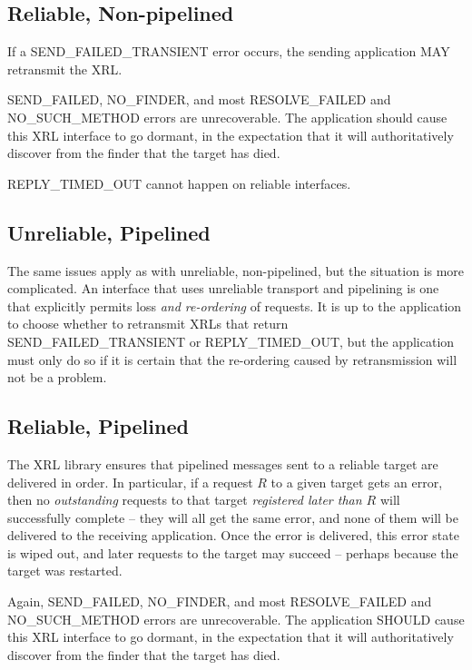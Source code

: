 \documentclass[11pt]{article}
\begin{document}
\subsection*{Reliable, Non-pipelined}

If a SEND\_FAILED\_TRANSIENT error occurs, the sending application MAY
retransmit the XRL.

SEND\_FAILED, NO\_FINDER, and most RESOLVE\_FAILED and
NO\_SUCH\_METHOD errors are unrecoverable.  The application should
cause this XRL interface to go dormant, in the expectation that it
will authoritatively discover from the finder that the target has
died.

REPLY\_TIMED\_OUT cannot happen on reliable interfaces.

\subsection*{Unreliable, Pipelined}

The same issues apply as with unreliable, non-pipelined, but the
situation is more complicated.  An interface that uses unreliable
transport and pipelining is one that explicitly permits loss \emph{and
re-ordering} of requests.  It is up to the application to choose
whether to retransmit XRLs that return SEND\_FAILED\_TRANSIENT or
REPLY\_TIMED\_OUT, but the application must only do so if it is
certain that the re-ordering caused by retransmission will not be a
problem.

\subsection*{Reliable, Pipelined}

The XRL library ensures that pipelined messages sent to a reliable target
are delivered in order. In particular, if a request $R$ to a given target
gets an error, then no \emph{outstanding} requests to that target
\emph{registered later than $R$} will successfully complete -- they will
all get the same error, and none of them will be delivered to the receiving
application. Once the error is delivered, this error state is wiped out,
and later requests to the target may succeed -- perhaps because the target
was restarted.

Again, SEND\_FAILED, NO\_FINDER, and most RESOLVE\_FAILED and
NO\_SUCH\_METHOD errors are unrecoverable.
The application SHOULD cause this XRL interface to go dormant, in the
expectation that it will authoritatively discover from the finder that
the target has died.
\end{document}

